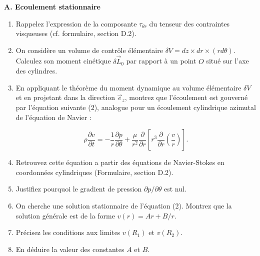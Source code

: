 
{\bf A. Ecoulement stationnaire}


\begin{enumerate}


\item Rappelez l'expression de la composante $\tau_{\theta r}$ du tenseur des contraintes visqueuses (cf. formulaire, section D.2).


\item On considère un volume de contrôle élémentaire 
$\delta V = d z \times d r \times (r d \theta)$. 
Calculez son moment cinétique $\delta \vec L_0$  par rapport à un point
 $O$ situé sur l'axe des cylindres.
 

\item En appliquant le théorème du moment dynamique au volume élémentaire
$\delta V$ et en projetant dans la direction $\vec e_z$, montrez que 
l'écoulement est gouverné par l'équation suivante (2), 
analogue pour un écoulement cylindrique azimutal de l'équation de Navier :

\begin{equation}
\rho \frac{\partial v}{\partial t} = - \frac{1}{r}\frac{\partial p}{\partial \theta}
+ \frac{\mu}{r^2}\frac{\partial}{\partial r}
\left[ r^3 \frac{\partial}{\partial r} \left( \frac{v}{r} \right) \right].
\end{equation}

\item Retrouvez cette équation a partir des équations de Navier-Stokes 
en coordonnées cylindriques (Formulaire, section D.2).

\item Justifiez pourquoi le gradient de pression $\partial p/\partial \theta$
est nul.

\item On cherche une solution stationnaire de l'équation (2).
Montrez que la solution générale est de la forme $v(r) = A r + B/r$.

\item Précisez les conditions aux limites $v(R_1)$ et $v(R_2)$.

\item En déduire la valeur des constantes $A$ et $B$.



\end{enumerate}
